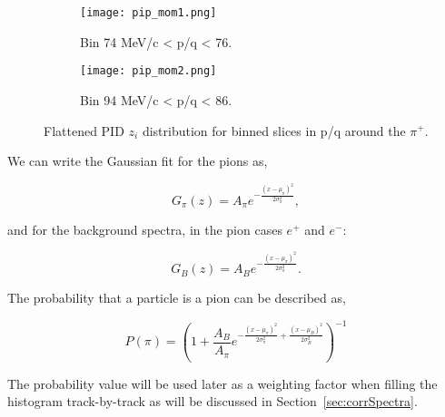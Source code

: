 \begin{figure}[!htb]
    \centering
    \begin{subfigure}[t]{0.49\textwidth}
        \centering
        \texttt{[image: pip\_mom1.png]}
        \caption{Bin 74 MeV/c < p/q < 76. } \label{fig:pipmom1}
    \end{subfigure}
    \hfill
    \begin{subfigure}[t]{.49\textwidth}
        \centering
        \texttt{[image: pip\_mom2.png]} 
        \caption{Bin 94 MeV/c < p/q < 86.} \label{fig:pipmom2}
    \end{subfigure}
  
    \caption{Flattened PID $z_i$ distribution  for binned slices in p/q around the $\pi^+$.}
\label{fig:pipmom_flat}
\end{figure}


We can write the Gaussian fit for the pions as, 

\begin{equation}
G_\pi(z) = A_\pi e^{-\frac{(x-\mu_\pi)^2}{2\sigma_\pi^2}},
\end{equation}

and for the background spectra, in the pion cases $e^+$ and $e^-$:

\begin{equation}
G_B(z) = A_B e^{-\frac{(x-\mu_\pi)^2}{2\sigma_\pi^2} }.
\end{equation}

The probability that a particle is a pion can be described as,

\begin{equation}
P(\pi) = \left( 1 + \frac{A_B}{A_\pi} e^{-\frac{(x-\mu_\pi)^2}{2\sigma_\pi^2}  + \frac{(x-\mu_B)^2}{2\sigma_B^2} } \right)^{-1}
\label{eq:pionProbs}
\end{equation}

The probability value will be used later as a weighting factor when filling the histogram track-by-track as will be discussed in Section~\ref{sec:corrSpectra}. 